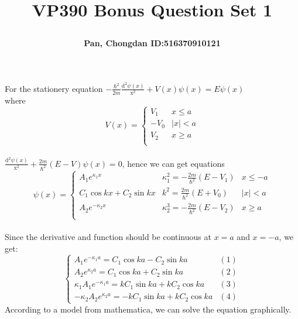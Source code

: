\documentclass[a4paper]{article}
\title{\Large \textbf{VP390 Bonus Question Set 1}\\
\author{\textbf{Pan, Chongdan ID:516370910121}\\
}
}
\begin{document}
\maketitle
    For the stationery equation $-\frac{\hbar^2}{2m}\frac{\mathrm{d}^2\psi(x)}{\mathrm{x^2}}+V(x)\psi(x)=E\psi(x)$
    \\where \[V(x)=\left\{\begin{array}{ll}
        V_1&x\leq a\\
        -V_0&|x|<a\\ 
        V_2&x\geq a\\  
        \end{array}\right.\]
    \\$\frac{\mathrm{d}^2\psi(x)}{\mathrm{x^2}}+\frac{2m}{\hbar^2}(E-V)\psi(x)=0$, hence we can get equations
    \[\psi(x)=\left\{\begin{array}{lll}
        A_1e^{\kappa_1x}&\kappa_1^2=-\frac{2m}{\hbar^2}(E-V_1)&x\leq -a\\
        C_1\cos kx+C_2\sin kx&k^2=\frac{2m}{\hbar^2}(E+V_0)&|x|<a\\ 
        A_2e^{-\kappa_2x}&\kappa_2^3=-\frac{2m}{\hbar^2}(E-V_2)&x\geq a\\  
        \end{array}\right.\]
    \\Since the derivative and function should be continuous at $x=a$ and $x=-a$, we get:
    \\\[\left\{\begin{array}{lr}
        A_1e^{-\kappa_1a}=C_1\cos ka-C_2\sin ka&(1)\\
        A_2e^{\kappa_2a}=C_1\cos ka+C_2\sin ka&(2)\\
        \kappa_1A_1e^{-\kappa_1a}=kC_1\sin ka+kC_2\cos ka&(3)\\
        -\kappa_2A_2e^{\kappa_2a}=-kC_1\sin ka+kC_2\cos ka&(4)
        \end{array}\right.\]
    According to a model from mathematica, we can solve the equation graphically\cite{1}.
\end{document}
